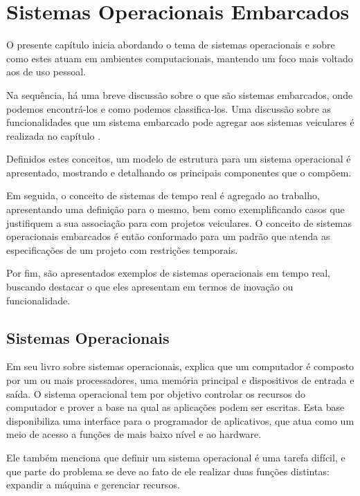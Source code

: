 \chapter{Sistemas Operacionais Embarcados}

O presente capítulo inicia abordando o tema de sistemas operacionais e sobre como estes atuam em ambientes computacionais, mantendo um foco mais voltado aos de uso pessoal.

Na sequência, há uma breve discussão sobre o que são sistemas embarcados, onde podemos encontrá-los  e como podemos classifica-los. Uma discussão sobre as funcionalidades que um sistema embarcado pode agregar aos sistemas veiculares é realizada no capítulo . %

Definidos estes conceitos, um modelo de estrutura para um sistema operacional é apresentado, mostrando e detalhando os principais componentes que o compõem.

Em seguida, o conceito de sistemas de tempo real é agregado ao trabalho, apresentando uma definição para o mesmo, bem como exemplificando casos que justifiquem a sua associação para com projetos veiculares. O conceito de sistemas operacionais embarcados é então conformado para um padrão que atenda as especificações de um projeto com restrições temporais.

Por fim, são apresentados exemplos de sistemas operacionais em tempo real, buscando destacar o que eles apresentam em termos de inovação ou funcionalidade.

\section{Sistemas Operacionais}

Em seu livro sobre sistemas operacionais,  explica que um computador é composto por um ou mais processadores, uma memória principal e dispositivos de entrada e saída. O sistema operacional tem por objetivo controlar os recursos do computador e prover a base na qual as aplicações podem ser escritas. Esta base disponibiliza uma interface para o programador de aplicativos, que atua como um meio de acesso a funções de mais baixo nível e ao hardware.

Ele também menciona que definir um sistema operacional é uma tarefa difícil, e que parte do problema se deve ao fato de ele realizar duas funções distintas: expandir a máquina e gerenciar recursos.

